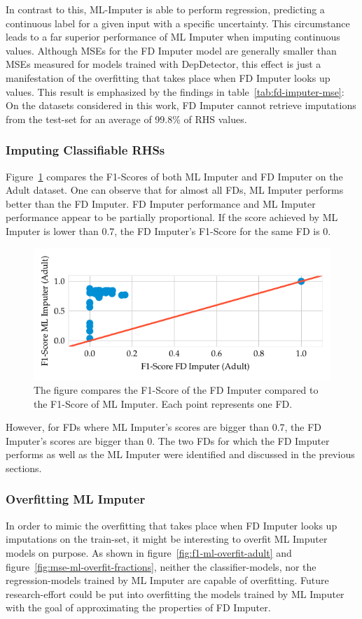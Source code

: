In contrast to this, ML-Imputer is able to perform regression, predicting a continuous label for a given input with a specific uncertainty.
This circumstance leads to a far superior performance of ML Imputer when imputing continuous values.
Although MSEs for the FD Imputer model are generally smaller than MSEs measured for models trained with DepDetector, this effect is just a manifestation of the overfitting that takes place when FD Imputer looks up values.
This result is emphasized by the findings in table~\ref{tab:fd-imputer-mse}:
On the datasets considered in this work, FD Imputer cannot retrieve imputations from the test-set for an average of 99.8\% of RHS values.

\subsubsection{Imputing Classifiable RHSs}
Figure~\ref{fig:f1_ml_fd_adult} compares the F1-Scores of both ML Imputer and FD Imputer on the Adult dataset.
One can observe that for almost all FDs, ML Imputer performs better than the FD Imputer.
FD Imputer performance and ML Imputer performance appear to be partially proportional.
If the score achieved by ML Imputer is lower than 0.7, the FD Imputer's F1-Score for the same FD is 0.
\begin{figure}[ht]
     \centering
     \includegraphics[width=\textwidth]{../figures/adult/f1_ml_fd}
     \caption{The figure compares the F1-Score of the FD Imputer compared to the F1-Score of ML Imputer. Each point represents one FD.}
     \label{fig:f1_ml_fd_adult}
 \end{figure}

However, for FDs where ML Imputer's scores are bigger than 0.7, the FD Imputer's scores are bigger than 0.
The two FDs for which the FD Imputer performs as well as the ML Imputer were identified and discussed in the previous sections.

\subsubsection{Overfitting ML Imputer}
In order to mimic the overfitting that takes place when FD Imputer looks up imputations on the train-set, it might be interesting to overfit ML Imputer models on purpose.
As shown in figure~\ref{fig:f1-ml-overfit-adult} and figure~\ref{fig:mse-ml-overfit-fractions}, neither the classifier-models, nor the regression-models trained by ML Imputer are capable of overfitting.
Future research-effort could be put into overfitting the models trained by ML Imputer with the goal of approximating the properties of FD Imputer.

